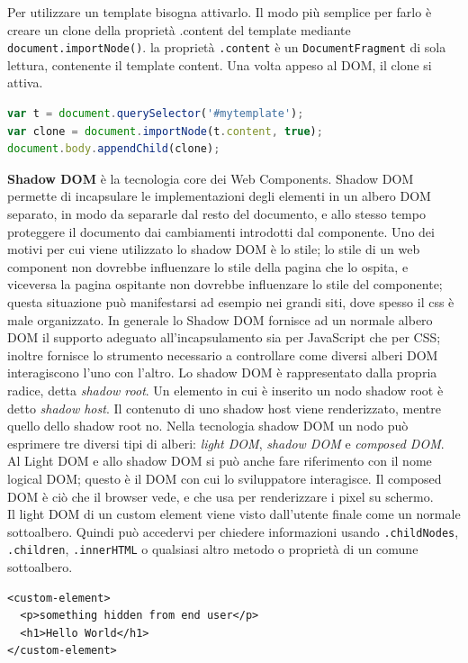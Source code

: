 Per utilizzare un template bisogna attivarlo. Il modo più semplice per farlo è creare un clone della proprietà .content del template mediante \texttt{document.importNode()}. la proprietà \texttt{.content} è un \texttt{DocumentFragment} di sola lettura, contenente il template content. Una volta appeso al DOM, il clone si attiva.
\begin{lstlisting}[language=JavaScript]
var t = document.querySelector('#mytemplate');
var clone = document.importNode(t.content, true);
document.body.appendChild(clone);
\end{lstlisting}

\textbf{Shadow DOM} è la tecnologia core dei Web Components. Shadow DOM permette di incapsulare le implementazioni degli elementi in un albero DOM separato, in modo da separarle dal resto del documento, e allo stesso tempo proteggere il documento dai cambiamenti introdotti dal componente. Uno dei motivi per cui viene utilizzato lo shadow DOM è lo stile; lo stile di un web component non dovrebbe influenzare lo stile della pagina che lo ospita, e viceversa la pagina ospitante non dovrebbe influenzare lo stile del componente; questa situazione può manifestarsi ad esempio nei grandi siti, dove spesso il css è male organizzato. In generale lo Shadow DOM fornisce ad un normale albero DOM il supporto adeguato all’incapsulamento sia per JavaScript che per CSS; inoltre fornisce lo strumento necessario a controllare come diversi alberi DOM interagiscono l’uno con l’altro. 
Lo shadow DOM è rappresentato dalla propria radice, detta \emph{shadow root}.
Un elemento in cui è inserito un nodo shadow root è detto \emph{shadow host}. Il contenuto di uno shadow host viene renderizzato, mentre quello dello shadow root no. 
Nella tecnologia shadow DOM un nodo può esprimere tre diversi tipi di alberi: \emph{light DOM}, \emph{shadow DOM} e \emph{composed DOM}.
Al Light DOM e allo shadow DOM si può anche fare riferimento con il nome logical DOM; questo è il DOM con cui lo sviluppatore interagisce. Il composed DOM è ciò che il browser vede, e che usa per renderizzare i pixel su schermo.
\\
Il light DOM di un custom element viene visto dall’utente finale come un normale sottoalbero. Quindi può accedervi per chiedere informazioni usando \texttt{.childNodes}, \texttt{.children}, \texttt{.innerHTML} o qualsiasi altro metodo o proprietà di un comune sottoalbero.
\begin{lstlisting}[language=HTML5]
<custom-element>
  <p>something hidden from end user</p>
  <h1>Hello World</h1>
</custom-element>
\end{lstlisting}
